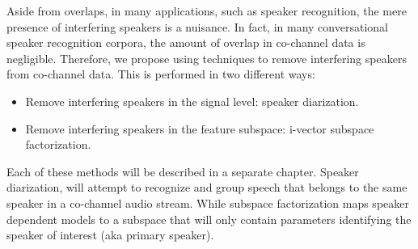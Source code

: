 Aside from overlaps, in many applications, such as speaker recognition, the mere presence of interfering speakers is a nuisance. 
In fact, in many conversational speaker recognition corpora, the amount of overlap in co-channel data is negligible. 
Therefore, we propose using techniques to remove interfering speakers from co-channel data. 
This is performed in two different ways: 
\begin{itemize}
\item Remove interfering speakers in the signal level: speaker diarization.
\item Remove interfering speakers in the feature subspace: i-vector subspace factorization.
\end{itemize}

Each of these methods will be described in a separate chapter. 
Speaker diarization, will attempt to recognize and group speech that belongs to the same speaker in a co-channel audio stream. 
While subspace factorization maps speaker dependent models to a subspace that will only contain parameters identifying the speaker of interest (aka primary speaker). 


 